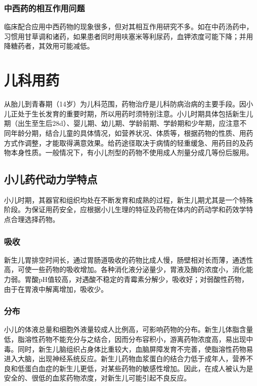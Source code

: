 \subsubsection{中西药的相互作用问题}

临床配合应用中西药物的现象很多，但对其相互作用研究不多。如在中药汤药中，习惯用甘草调和诸药，如果患者同时用呋塞米等利尿药，血钾浓度可能下降；并用降糖药者，其效用可能减低。

\section{儿科用药}

从胎儿到青春期（14岁）为儿科范围，药物治疗是儿科防病治病的主要手段。因小儿正处于生长发育的重要时期，所以用药时须特别注意。小儿时期具体包括新生儿期（出生至生后28d）、婴儿期、幼儿期、学龄前期、学龄期和少年期，应注意不同年龄分期，结合儿童的具体情况，如营养状况、体质等，根据药物的性质、用药方式作调整，才能取得满意效果。给药途径取决于病情的轻重缓急、用药目的及药物本身性质。一般情况下，有小儿剂型的药物不使用成人剂量分成几等份后服用。

\subsection{小儿药代动力学特点}

小儿时期，其器官和组织均处在不断发育和成熟的过程，新生儿期尤其是一个特殊阶段。为保证用药安全，应根据小儿生理的特征及药物在体内的药动学和药效学特点合理选择药物。

\subsubsection{吸收}

新生儿胃排空时间长，通过胃肠道吸收的药物比成人慢，肠壁相对长而薄，通透性高，可使一些药物的吸收增加。各种消化液分泌量少，胃液及酶的浓度小，消化能力弱。胃酸pH值较高，对遇酸不稳定的青霉素分解少，吸收好；对弱酸性药物，由于在胃液中解离增加，吸收少。

\subsubsection{分布}

小儿的体液总量和细胞外液量较成人比例高，可影响药物的分布。新生儿体脂含量低，脂溶性药物不能充分与之结合，因而分布容积小，游离药物浓度高，易出现中毒。同时，新生儿脑组织占身体比重较大，血脑屏障发育不完善，使脂溶性药物易进入大脑，出现神经系统反应。新生儿药物血浆蛋白的结合力低于成年人，营养不良和低蛋白血症的新生儿更低，对某些药物的敏感性增加。因此，在成人被认为是安全的、很低的血浆药物浓度，对新生儿可能引起不良反应。

